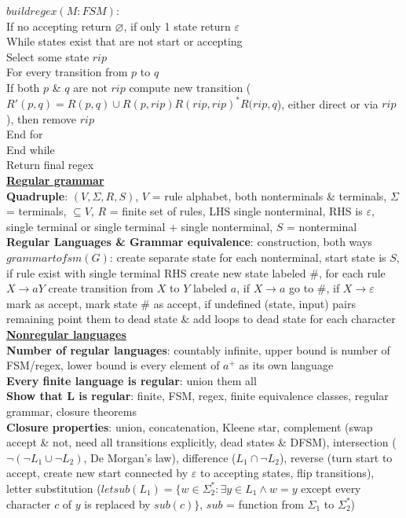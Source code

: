 \documentclass[a4paper]{article}
\begin{document}
\begin{multicols}{2}
        \boldmath$buildregex(M: FSM)$\unboldmath:\\
        If no accepting return $\varnothing$, if only 1 state return $\varepsilon$\\
        While states exist that are not start or accepting\\
        Select some state $rip$\\
        For every transition from $p$ to $q$\\
        If both $p$ \& $q$ are not $rip$ compute new transition ($R'(p,q) = R(p,q) \cup R(p,rip) {R(rip, rip)}^* R(rip, q$), either direct or via $rip$), then remove $rip$\\
        End for\\
        End while\\
        Return final regex\\
        \underline{\textbf{Regular grammar}}\\
        \textbf{Quadruple}: $(V, \Sigma, R, S)$, $V$ = rule alphabet, both nonterminals \& terminals, $\Sigma$ = terminals, $\subseteq V$, $R$ = finite set of rules, LHS single nonterminal, RHS is $\varepsilon$, single terminal or single terminal + single nonterminal, $S$ = nonterminal\\
        \textbf{Regular Languages \& Grammar equivalence}: construction, both ways\\
        \boldmath$grammartofsm(G)$\unboldmath: create separate state for each nonterminal, start state is $S$, if rule exist with single terminal RHS create new state labeled \#, for each rule $X \to aY$ create transition from $X$ to $Y$ labeled $a$, if $X \to a$ go to \#, if $X \to \varepsilon$ mark as accept, mark state \# as accept, if undefined (state, input) pairs remaining point them to dead state \& add loops to dead state for each character\\
        \underline{\textbf{Nonregular languages}}\\
        \textbf{Number of regular languages}: countably infinite, upper bound is number of FSM/regex, lower bound is every element of $a^+$ as its own language\\
        \textbf{Every finite language is regular}: union them all\\
        \textbf{Show that L is regular}: finite, FSM, regex, finite equivalence classes, regular grammar, closure theorems\\
        \textbf{Closure properties}: union, concatenation, Kleene star, complement (swap accept \& not, need all transitions explicitly, dead states \& DFSM), intersection ($\neg(\neg L_1 \cup \neg L_2)$, De Morgan's law), difference ($L_1 \cap \neg L_2$), reverse (turn start to accept, create new start connected by $\varepsilon$ to accepting states, flip transitions), letter substitution ($letsub(L_1) = \{ w \in \Sigma_2^* : \exists y \in L_1 \wedge w = y$ except every character $c$ of $y$ is replaced by $sub(c) \}$, $sub$ = function from $\Sigma_1$ to $\Sigma_2^*$)\\

\end{multicols}
\end{document}
